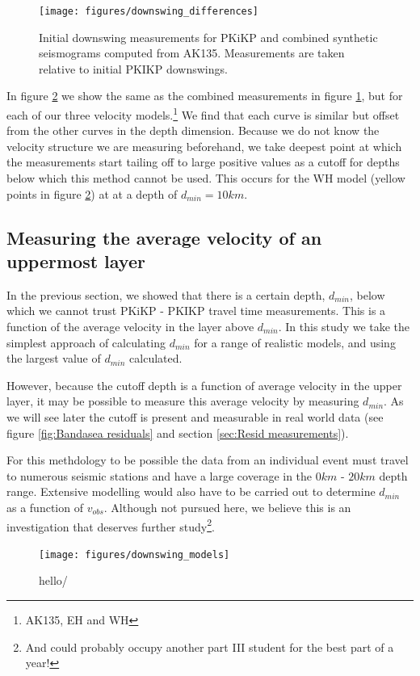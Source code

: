 \documentclass[11pt,a4paper]{article}
\begin{document}
\begin{figure}
	\centering
	\texttt{[image: figures/downswing\_differences]}
	\caption{Initial downswing measurements for PKiKP and combined synthetic seismograms computed from AK135. Measurements are taken relative to initial PKIKP downswings.}
	\label{fig:Downswing differences}
\end{figure}

In figure \ref{fig:Downswing models} we show the same as the combined measurements in figure \ref{fig:Downswing differences}, but for each of our three  velocity models.\footnote{AK135, EH and WH} We find that each curve is similar but offset from the other curves in the depth dimension. Because we do not know the velocity structure we are measuring beforehand, we take deepest point at which the measurements start tailing off to large positive values as a cutoff for depths below which this method cannot be used. This occurs for the WH model (yellow points in figure \ref{fig:Downswing models}) at at a depth of $d_{min} = 10km$.

\subsection{Measuring the average velocity of an uppermost layer}
In the previous section, we showed that there is a certain depth, $d_{min}$, below which we cannot trust PKiKP - PKIKP travel time measurements. This is a function of the average velocity in the layer above $d_{min}$. In this study we take the simplest approach of calculating $d_{min}$ for a range of realistic models, and using the largest value of $d_{min}$ calculated.

However, because the cutoff depth is a function of average velocity in the upper layer, it may be possible to measure this average velocity by measuring $d_{min}$. As we will see later the cutoff is present and measurable in real world data (see figure \ref{fig:Bandasea residuals} and section \ref{sec:Resid measurements}).

For this methdology to be possible the data from an individual event must travel to numerous seismic stations and have a large coverage in the $0km$ - $20km$ depth range. Extensive modelling would also have to be carried out to determine $d_{min}$ as a function of $v_{obs}$. Although not pursued here, we believe this is an investigation that deserves further study\footnote{And could probably occupy another part III student for the best part of a year!}.

\begin{figure}
	\centering
	\texttt{[image: figures/downswing\_models]}
	\caption{hello/}
	\label{fig:Downswing models}
\end{figure}
\end{document}
